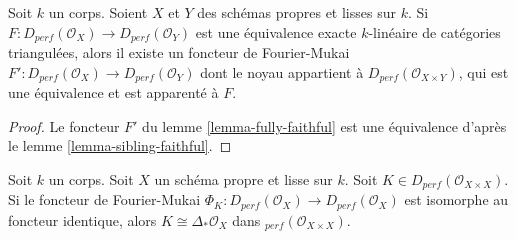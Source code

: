 \begin{proposition}
\label{proposition-equivalence}
Soit $k$ un corps. Soient $X$ et $Y$ des schémas propres et lisses sur $k$.
Si $F : D_{perf}(\mathcal{O}_X) \to D_{perf}(\mathcal{O}_Y)$
est une équivalence exacte $k$-linéaire de catégories triangulées, alors
il existe un foncteur de Fourier-Mukai
$F' : D_{perf}(\mathcal{O}_X) \to D_{perf}(\mathcal{O}_Y)$ dont le
noyau appartient à $D_{perf}(\mathcal{O}_{X \times Y})$,
qui est une équivalence et est apparenté à $F$.
\end{proposition}

\begin{proof}
Le foncteur $F'$ du lemme \ref{lemma-fully-faithful}
est une équivalence d'après le lemme \ref{lemma-sibling-faithful}.
\end{proof}

\begin{lemma}
\label{lemma-uniqueness}
Soit $k$ un corps. Soit $X$ un schéma propre et lisse sur $k$.
Soit $K \in D_{perf}(\mathcal{O}_{X \times X})$. Si le foncteur de Fourier-Mukai
$\Phi_K : D_{perf}(\mathcal{O}_X) \to D_{perf}(\mathcal{O}_X)$
est isomorphe au foncteur identique, alors
$K \cong \Delta_*\mathcal{O}_X$ dans $_{perf}(\mathcal{O}_{X \times X})$.
\end{lemma}

